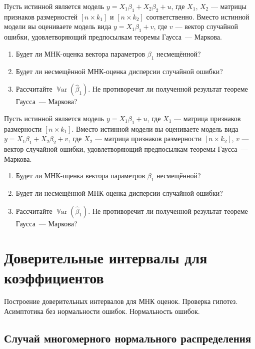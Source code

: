 \documentclass[12pt]{article}
\DeclareMathOperator{\Var}{\mathbb{V}ar}
\newcommand{\hb}{\hat{\beta}}
\begin{document}
\begin{problem}
Пусть истинной является модель $y = X_1\beta_1+ X_2\beta_2+u$, где $X_1$, $X_2$  — матрицы признаков размерностей $[n \times k_1]$ и $[n \times k_2]$ соответственно. Вместо истинной модели вы оцениваете модель вида $y = X_1\beta_1+v$, где $v$ — вектор случайной ошибки, удовлетворяющий предпосылкам теоремы Гаусса~— Маркова.
\begin{enumerate}
    \item Будет ли МНК-оценка вектора параметров $\beta_1$ несмещённой?
    \item Будет ли несмещённой МНК-оценка дисперсии случайной ошибки?
    \item Рассчитайте $\Var(\hb_1)$. Не противоречит ли полученной результат теореме Гаусса~— Маркова?
\end{enumerate}
\end{problem}

\begin{problem}
Пусть истинной является модель $y = X_1\beta_1+u$, где $X_1$ — матрица признаков размерности $[n \times k_1]$. Вместо истинной модели вы оцениваете модель вида $y = X_1\beta_1+ X_2\beta_2+v$, где $X_2$  — матрица признаков размерности  $[n \times k_2]$, $v$ — вектор случайной ошибки, удовлетворяющий предпосылкам теоремы Гаусса~— Маркова.
\begin{enumerate}
    \item Будет ли МНК-оценка вектора параметров $\beta_1$ несмещённой?
    \item Будет ли несмещённой МНК-оценка дисперсии случайной ошибки?
    \item Рассчитайте $\Var(\hb_1)$. Не противоречит ли полученной результат теореме Гаусса~— Маркова?
\end{enumerate}
\end{problem}

\section{Доверительные интервалы для коэффициентов}
Построение доверительных интервалов для МНК оценок. Проверка гипотез. Асимптотика без нормальности ошибок. Нормальность ошибок.


\subsection{Случай многомерного нормального распределения}
\end{document}
